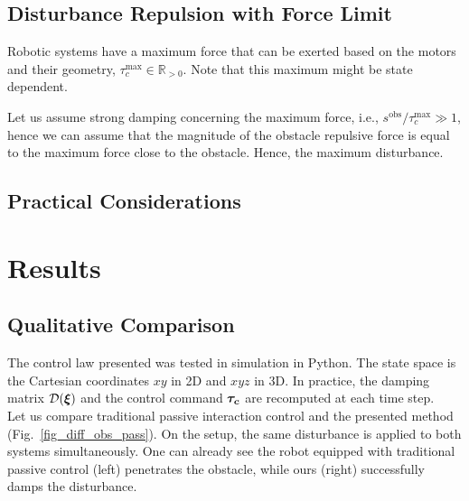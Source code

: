 \documentclass[conference]{IEEEtran}
\begin{document}
\subsection{Disturbance Repulsion with Force Limit}
Robotic systems have a maximum force that can be exerted based on the motors and their geometry, $\tau_c^{\mathrm{max}} \in \mathbb{R}_{>0}$. Note that this maximum might be state dependent.

Let  us assume strong damping concerning the maximum force, i.e., $s^{\mathrm{obs}} / \tau_c^{\mathrm{max}} \gg 1$, hence we can assume that the magnitude of the obstacle repulsive force is equal to the maximum force close to the obstacle. Hence, the maximum disturbance.

\subsection{Practical Considerations}






\section{Results} 
\subsection{Qualitative Comparison} \label{sec:qual_comp}
The control law presented was tested in simulation in Python. The state space is the Cartesian coordinates $xy$ in 2D and $xyz$ in 3D. In practice, the damping matrix $\mathcal{D}(\boldsymbol{\xi})$ and the control command $\boldsymbol{\tau_c}$ are recomputed at each time step.\\

Let us compare traditional passive interaction control and the presented method (Fig.~\ref{fig_diff_obs_pass}). On the setup, the same disturbance is applied to both systems simultaneously. One can already see the robot equipped with traditional passive control (left) penetrates the obstacle, while ours (right) successfully damps the disturbance.
\end{document}
